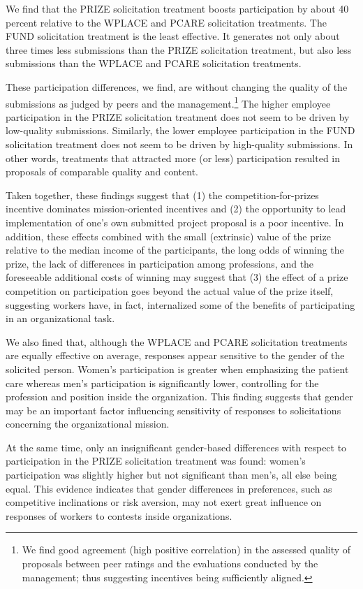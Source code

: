 \documentclass[12pt, titlepage]{article}
\begin{document}
We find that the PRIZE solicitation treatment boosts participation by
about 40 percent relative to the WPLACE and PCARE solicitation
treatments. The FUND solicitation treatment is the least effective. It
generates not only about three times less submissions than the PRIZE
solicitation treatment, but also less submissions than the WPLACE and
PCARE solicitation treatments.

These participation differences, we find, are without changing the
quality of the submissions as judged by peers and the
management.\footnote{We find good agreement (high positive correlation)
  in the assessed quality of proposals between peer ratings and the
  evaluations conducted by the management; thus suggesting incentives
  being sufficiently aligned.} The higher employee participation in the
PRIZE solicitation treatment does not seem to be driven by low-quality
submissions. Similarly, the lower employee participation in the FUND
solicitation treatment does not seem to be driven by high-quality
submissions. In other words, treatments that attracted more (or less)
participation resulted in proposals of comparable quality and content.

Taken together, these findings suggest that (1) the
competition-for-prizes incentive dominates mission-oriented incentives
and (2) the opportunity to lead implementation of one's own submitted
project proposal is a poor incentive. In addition, these effects
combined with the small (extrinsic) value of the prize relative to the
median income of the participants, the long odds of winning the prize,
the lack of differences in participation among professions, and the
foreseeable additional costs of winning may suggest that (3) the effect
of a prize competition on participation goes beyond the actual value of
the prize itself, suggesting workers have, in fact, internalized some of
the benefits of participating in an organizational task.

We also fined that, although the WPLACE and PCARE solicitation
treatments are equally effective on average, responses appear sensitive
to the gender of the solicited person. Women's participation is greater
when emphasizing the patient care whereas men's participation is
significantly lower, controlling for the profession and position inside
the organization. This finding suggests that gender may be an important
factor influencing sensitivity of responses to solicitations concerning
the organizational mission.

At the same time, only an insignificant gender-based differences with
respect to participation in the PRIZE solicitation treatment was found:
women's participation was slightly higher but not significant than
men's, all else being equal. This evidence indicates that gender
differences in preferences, such as competitive inclinations or risk
aversion, may not exert great influence on responses of workers to
contests inside organizations.
\end{document}
